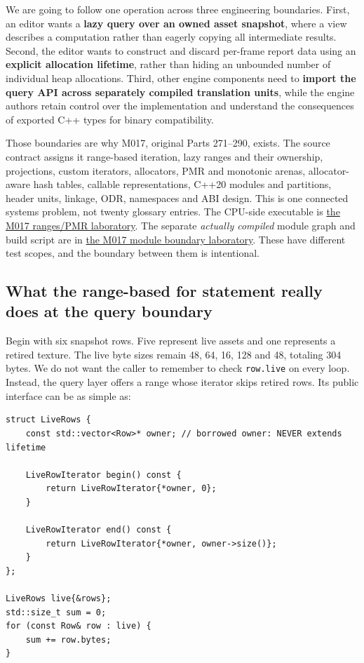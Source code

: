 We are going to follow one operation across three engineering boundaries. First, an editor wants a \textbf{lazy query over an owned asset snapshot}, where a view describes a computation rather than eagerly copying all intermediate results. Second, the editor wants to construct and discard per-frame report data using an \textbf{explicit allocation lifetime}, rather than hiding an unbounded number of individual heap allocations. Third, other engine components need to \textbf{import the query API across separately compiled translation units}, while the engine authors retain control over the implementation and understand the consequences of exported C++ types for binary compatibility.

Those boundaries are why M017, original Parts 271--290, exists. The source contract assigns it range-based iteration, lazy ranges and their ownership, projections, custom iterators, allocators, PMR and monotonic arenas, allocator-aware hash tables, callable representations, C++20 modules and partitions, header units, linkage, ODR, namespaces and ABI design. This is one connected systems problem, not twenty glossary entries. The CPU-side executable is \href{tools/labs/asset_ranges_pmr_lab.cpp}{the M017 ranges/PMR laboratory}. The separate \emph{actually compiled} module graph and build script are in \href{tools/modules/build_module_lab.sh}{the M017 module boundary laboratory}. These have different test scopes, and the boundary between them is intentional.

\subsection{What the range-based for statement really does at the query boundary}\label{05-engine-i-ch006-what-the-range-based-for-statement-really-does-at-the-query-boundary}

Begin with six snapshot rows. Five represent live assets and one represents a retired texture. The live byte sizes remain 48, 64, 16, 128 and 48, totaling 304 bytes. We do not want the caller to remember to check \texttt{row.live} on every loop. Instead, the query layer offers a range whose iterator skips retired rows. Its public interface can be as simple as:

\begin{verbatim}
struct LiveRows {
    const std::vector<Row>* owner; // borrowed owner: NEVER extends lifetime

    LiveRowIterator begin() const {
        return LiveRowIterator{*owner, 0};
    }

    LiveRowIterator end() const {
        return LiveRowIterator{*owner, owner->size()};
    }
};

LiveRows live{&rows};
std::size_t sum = 0;
for (const Row& row : live) {
    sum += row.bytes;
}
\end{verbatim}

